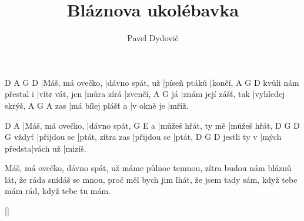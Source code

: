 \documentclass{song}
\title{Bláznova ukolébavka}
\author{Pavel Dydovič}
\begin{document}
\strophe
D                A               G            D
|Máš, má ovečko, |dávno spát, už |píseň ptáků |končí,
                    A              G          D
kvůli nám přestal i |vítr vát, jen |můra zírá |zvenčí,
   A                    G 
já |znám její zášť, tak |vyhledej skrýš,
    A                 G          A
zas |má bílej plášť a |v okně je |mříž.
\endstrophe

D                A
|Máš, má ovečko, |dávno spát,
  G                  E
a |můžeš hřát, ty mě |můžeš hřát,
      D           G                D           G
vždyť |přijdou se |ptát, zítra zas |přijdou se |ptát,
            D            G        D
jestli ty v |mých předsta|vách už |mizíš.
\endstrophe

\strophe*
Máš, má ovečko, dávno spát, už máme půlnoc temnou,
zítra budou nám bláznů lát, že ráda snídáš se mnou,
proč měl bych jim lhát, že jsem tady sám,
když tebe mám rád, když tebe tu mám.
\endstrophe

\ref{}
\end{document}
